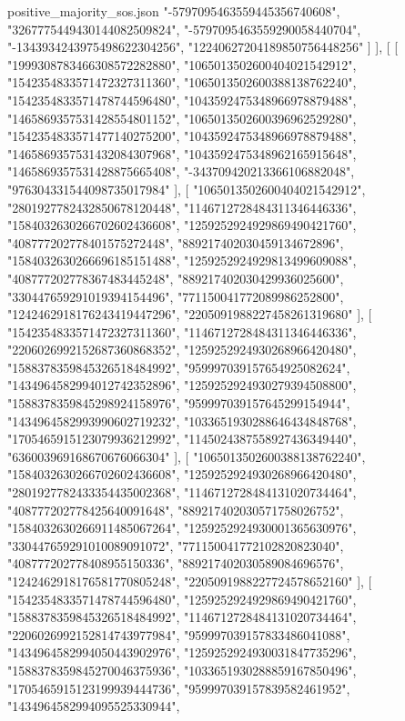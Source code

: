\begin{filecontents*}[overwrite]{positive_majority_sos.json}
    "-5797095463559445356740608",
    "3267775449430144082509824",
    "-5797095463559290058440704",
    "-1343934243975498622304256",
    "12240627204189850756448256"
   ]
  ],
  [
   [
    "1999308783466308572282880",
    "1065013502600404021542912",
    "1542354833571472327311360",
    "1065013502600388138762240",
    "1542354833571478744596480",
    "1043592475348966978879488",
    "1465869357531428554801152",
    "1065013502600396962529280",
    "1542354833571477140275200",
    "1043592475348966978879488",
    "1465869357531432084307968",
    "1043592475348962165915648",
    "1465869357531428875665408",
    "-343709420213366106882048",
    "976304331544098735017984"
   ],
   [
    "1065013502600404021542912",
    "2801927782432850678120448",
    "1146712728484311346446336",
    "1584032630266702602436608",
    "1259252924929869490421760",
    "408777202778401575272448",
    "889217402030459134672896",
    "1584032630266696185151488",
    "1259252924929813499609088",
    "408777202778367483445248",
    "889217402030429936025600",
    "330447659291019394154496",
    "771150041772089986252800",
    "1242462918176243419447296",
    "2205091988227458261319680"
   ],
   [
    "1542354833571472327311360",
    "1146712728484311346446336",
    "2206026992152687360868352",
    "1259252924930268966420480",
    "1588378359845326518484992",
    "959997039157654925082624",
    "1434964582994012742352896",
    "1259252924930279394508800",
    "1588378359845298924158976",
    "959997039157645299154944",
    "1434964582993990602719232",
    "1033651930288646434848768",
    "1705465915123079936212992",
    "1145024387558927436349440",
    "636003969168670676066304"
   ],
   [
    "1065013502600388138762240",
    "1584032630266702602436608",
    "1259252924930268966420480",
    "2801927782433354435002368",
    "1146712728484131020734464",
    "408777202778425640091648",
    "889217402030571758026752",
    "1584032630266911485067264",
    "1259252924930001365630976",
    "330447659291010089091072",
    "771150041772102820823040",
    "408777202778408955150336",
    "889217402030589084696576",
    "1242462918176581770805248",
    "2205091988227724578652160"
   ],
   [
    "1542354833571478744596480",
    "1259252924929869490421760",
    "1588378359845326518484992",
    "1146712728484131020734464",
    "2206026992152814743977984",
    "959997039157833486041088",
    "1434964582994050443902976",
    "1259252924930031847735296",
    "1588378359845270046375936",
    "1033651930288859167850496",
    "1705465915123199939444736",
    "959997039157839582461952",
    "1434964582994095525330944",

\end{filecontents*}
